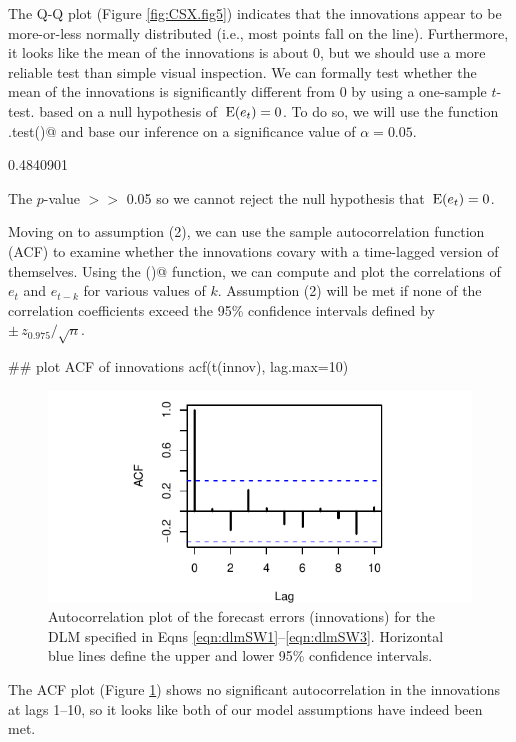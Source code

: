 \documentclass[10pt]{article}
\def\E{\,\textup{\textrm{E}}}
\begin{document}
The Q-Q plot (Figure \ref{fig:CSX.fig5}) indicates that the innovations appear to be more-or-less normally distributed (i.e., most points fall on the line). Furthermore, it looks like the mean of the innovations is about 0, but we should use a more reliable test than simple visual inspection. We can formally test whether the mean of the innovations is significantly different from 0 by using a one-sample $t$-test.  based on a null hypothesis of $\E(e_t)=0$. To do so, we will use the function \verb@t.test()@ and base our inference on a significance value of $\alpha = 0.05$.
\begin{Schunk}
\begin{Soutput}
[1] 0.4840901
\end{Soutput}
\end{Schunk}
The $p$-value $>>$ 0.05 so we cannot reject the null hypothesis that $\E(e_t)=0$.

Moving on to assumption (2), we can use the sample autocorrelation function (ACF) to examine whether the innovations covary with a time-lagged version of themselves. Using the \verb@acf()@ function, we can compute and plot the correlations of $e_t$ and $e_{t-k}$ for various values of $k$. Assumption (2) will be met if none of the correlation coefficients exceed the 95\% confidence intervals defined by $\pm \, z_{0.975} / $.
\begin{Schunk}
\begin{Sinput}
 ## plot ACF of innovations
 acf(t(innov), lag.max=10)
\end{Sinput}
\end{Schunk}
\begin{figure}[htp]
\begin{center}
\includegraphics{DLM_lab_5-plotdlmACF}
\end{center}
\caption{Autocorrelation plot of the forecast errors (innovations) for the DLM specified in Eqns \ref{eqn:dlmSW1}--\ref{eqn:dlmSW3}. Horizontal blue lines define the upper and lower 95\% confidence intervals.}
\label{fig:CSX.fig6}
\end{figure}
The ACF plot (Figure \ref{fig:CSX.fig6}) shows no significant autocorrelation in the innovations at lags 1--10, so it looks like both of our model assumptions have indeed been met.
\end{document}
